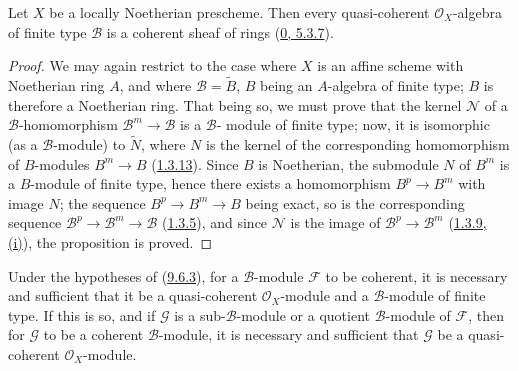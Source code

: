 \begin{proposition}[9.6.3]
\label{I.9.6.3}
Let $X$ be a locally Noetherian prescheme. Then every quasi-coherent
$\mathscr{O}_X$-algebra of finite type $\mathscr{B}$ is a coherent sheaf of
rings (\hyperref[0.5.3.7]{0, 5.3.7}).
\end{proposition}

\begin{proof}
We may again restrict to the case where $X$ is an affine scheme with
Noetherian ring $A$, and where $\mathscr{B}=\widetilde{B}$, $B$ being an
$A$-algebra of finite type; $B$ is therefore a Noetherian ring. That being
so, we must prove that the kernel $\mathscr{N}$ of a
$\mathscr{B}$-homomorphism $\mathscr{B}^m\to\mathscr{B}$ is a
$\mathscr{B}$-
module of finite type; now, it is isomorphic (as a
$\mathscr{B}$-module) to $\widetilde{N}$, where $N$ is the kernel of the
corresponding homomorphism of $B$-modules $B^m\to B$
(\hyperref[I.1.3.13]{1.3.13}). Since $B$ is Noetherian, the submodule
$N$ of $B^m$ is a $B$-module of finite type, hence there exists a
homomorphism $B^p\to B^m$ with image $N$; the sequence $B^p\to B^m\to B$
being exact, so is the corresponding sequence
$\mathscr{B}^p\to\mathscr{B}^m\to\mathscr{B}$
(\hyperref[I.1.3.5]{1.3.5}), and since $\mathscr{N}$ is the image of
$\mathscr{B}^p\to\mathscr{B}^m$
(\hyperref[I.1.3.9]{1.3.9, (i)}), the proposition is proved.
\end{proof}

\begin{corollary}[9.6.4]
\label{I.9.6.4}
Under the hypotheses of (\hyperref[I.9.6.3]{9.6.3}), for a
$\mathscr{B}$-module $\mathscr{F}$ to be coherent, it is necessary and
sufficient that it be a quasi-coherent $\mathscr{O}_X$-module and a
$\mathscr{B}$-module of finite type. If this is so, and if $\mathscr{G}$
is a sub-$\mathscr{B}$-module or a quotient $\mathscr{B}$-module of
$\mathscr{F}$, then for $\mathscr{G}$ to be a coherent $\mathscr{B}$-module,
it is necessary and sufficient that $\mathscr{G}$ be a quasi-coherent
$\mathscr{O}_X$-module.
\end{corollary}

